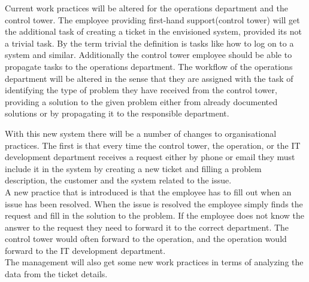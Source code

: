 Current work practices will be altered for the operations department and the control tower.
The employee providing first-hand support(control tower) will get the additional task of creating a ticket in the envisioned system, provided its not a trivial task. By the term trivial the definition is tasks like how to log on to a system and similar.
Additionally the control tower employee should be able to propagate tasks to the operations department.
The workflow of the operations department will be altered in the sense that they are assigned with the task of identifying the type of problem they have received from the control tower, providing a solution to the given problem either from already documented solutions or by propagating it to the responsible department.

With this new system there will be a number of changes to organisational practices. The first is that every time the control tower, the operation, or the IT development department receives a request either by phone or email they must include it in the system by creating a new ticket and filling a problem description, the customer and the system related to the issue.
\\
A new practice that is introduced is that the employee has to fill out when an issue has been resolved. When the issue is resolved the employee simply finds the request and fill in the solution to the problem.
If the employee does not know the answer to the request they need to forward it to the correct department. The control tower would often forward to the operation, and the operation would forward to the IT development department. 
\\
The management will also get some new work practices in terms of analyzing the data from the ticket details.

